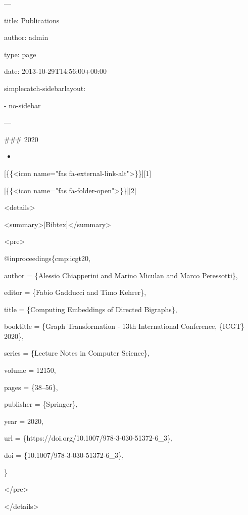 \documentclass[a4paper,11pt,titlepage]{book}
\begin{document}
\nobibliography*
---

title: Publications 

author: admin 

type: page 

date: 2013-10-29T14:56:00+00:00 

simplecatch-sidebarlayout: 

  - no-sidebar 

---

\#\#\# 2020

\begin{itemize}
    \item {}
\end{itemize}

[\{\{\textless icon name="fas fa-external-link-alt"\textgreater\}\}][1]

    [\{\{\textless icon name="fas fa-folder-open"\textgreater\}\}][2]

\textless details\textgreater\par
\textless summary\textgreater[Bibtex]\textless/summary\textgreater\par
\textless pre\textgreater\par
@inproceedings\{cmp:icgt20,

  author = \{Alessio Chiapperini and Marino Miculan and Marco Peressotti\},

  editor = \{Fabio Gadducci and Timo Kehrer\},

  title = \{Computing Embeddings of Directed Bigraphs\},

  booktitle = \{Graph Transformation - 13th International Conference, \{ICGT\} 2020\},

  series = \{Lecture Notes in Computer Science\},

  volume = 12150,

  pages = \{38--56\},

  publisher = \{Springer\},

  year = 2020,

  url = \{https://doi.org/10.1007/978-3-030-51372-6\_3\},

  doi = \{10.1007/978-3-030-51372-6\_3\},

\}

\textless /pre\textgreater

\textless /details\textgreater



%
\end{document}
